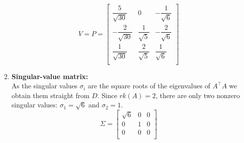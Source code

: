 \begin{enumerate}
    \[
        \renewcommand{\arraystretch}{2}
        V = P =
        \begin{bmatrix}
            \dfrac{5}{\sqrt{30}} & 0 & -\dfrac{1}{\sqrt{6}} \\
            -\dfrac{2}{\sqrt{30}} & \dfrac{1}{\sqrt{5}} & -\dfrac{2}{\sqrt{6}} \\
            \dfrac{1}{\sqrt{30}} & \dfrac{2}{\sqrt{5}} & \dfrac{1}{\sqrt{6}} \\
        \end{bmatrix}
    \]

    \vspace{0.5cm}
    \item \textbf{Singular-value matrix:}\\
    As the singular values $\sigma _i$ are the square roots of the eigenvalues of $A^\top A$ we obtain them straight from $D$. Since $rk(A) = 2$, there are only two nonzero singular values: $\sigma _1 = \sqrt{6}$ and $\sigma _2 = 1$.
    \[
        \Sigma = 
        \begin{bmatrix}
            \sqrt{6} & 0 & 0 \\
            0 & 1 & 0 \\
            0 & 0 & 0 \\
        \end{bmatrix}
    \]


\end{enumerate}
